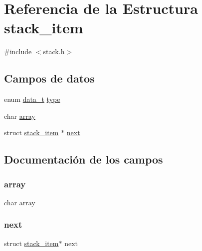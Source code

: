 \hypertarget{structstack__item}{}\section{Referencia de la Estructura stack\+\_\+item}
\label{structstack__item}


{\ttfamily \#include $<$stack.\+h$>$}

\subsection*{Campos de datos}
\begin{DoxyCompactItemize}
\item 
enum \mbox{\hyperlink{hashtable_8h_adb5f3584b941a8dc0fed6b7302b4b8eb}{data\+\_\+t}} \mbox{\hyperlink{structstack__item_a0c6169f5c94682132bbbe974784559e6}{type}}
\item 
char \mbox{\hyperlink{structstack__item_a76224348fd73cd6ef63a09ed36b0728b}{array}}
\item 
struct \mbox{\hyperlink{structstack__item}{stack\+\_\+item}} $\ast$ \mbox{\hyperlink{structstack__item_a0bd53e44edb84db0a4f76ab6d57b7a18}{next}}
\end{DoxyCompactItemize}


\subsection{Documentación de los campos}
\mbox{\label{structstack__item_a76224348fd73cd6ef63a09ed36b0728b}} 
\subsubsection{\texorpdfstring{array}{array}}
{\footnotesize\ttfamily char array}

\mbox{\label{structstack__item_a0bd53e44edb84db0a4f76ab6d57b7a18}} 
\subsubsection{\texorpdfstring{next}{next}}
{\footnotesize\ttfamily struct \mbox{\hyperlink{structstack__item}{stack\+\_\+item}}$\ast$ next}

